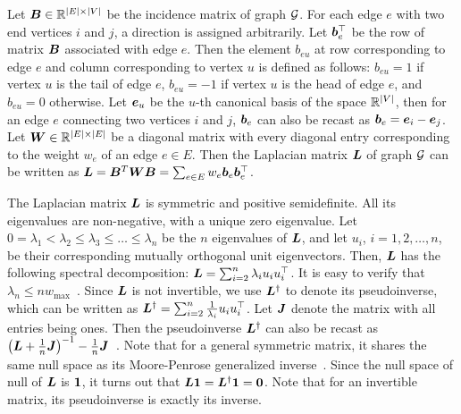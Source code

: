 \documentclass[10pt,twocolumn,twoside]{IEEEtran}
\begin{document}
Let \(\boldsymbol{B} \in \mathbb{R}^{|E| \times \left|V \right|}\) be the incidence matrix of graph \(\mathcal{G}\). For each edge \(e\) with two end vertices \(i\) and \(j\), a direction is assigned arbitrarily. Let \(\boldsymbol{b}_e^\top\) be the row of matrix \(\boldsymbol{B}\) associated with edge \(e\). Then the element \(b_{eu}\) at row corresponding to edge \(e\) and column corresponding to vertex \(u\) is defined as follows: \(b_{eu} = 1\) if vertex \(u\) is the tail of edge \(e\), \(b_{eu}=-1\) if vertex \(u\) is the head of  edge \(e\), and \(b_{eu}=0\) otherwise. Let \(\boldsymbol{e}_u\) be the \(u\)-th canonical basis of the space \(\mathbb{R}^{\left|V \right|}\), then for an edge \(e\) connecting two vertices \(i\) and \(j\), \(\boldsymbol{b}_e\) can also be recast as \(\boldsymbol{b}_e=\boldsymbol{e}_{i}-\boldsymbol{e}_{j}\).  Let  \(\boldsymbol{W} \in \mathbb{R}^{|E| \times |E|}\) be a diagonal matrix with every diagonal entry corresponding to the weight  \(w_e\) of an edge  $e\in E$. Then the Laplacian matrix \(\boldsymbol{L}\) of graph \(\mathcal{G}\) can be written as \(\boldsymbol{L}=\boldsymbol{B}^T\boldsymbol{W}\boldsymbol{B}=\sum_{e\in E}w_e\boldsymbol{b}_e\boldsymbol{b}_e^{\top}\).

The Laplacian matrix \(\boldsymbol{L}\) is symmetric and positive semidefinite. All  its eigenvalues  are non-negative, with a unique zero eigenvalue. Let \(0=\lambda_1< \lambda_2 \leq \lambda_3\leq \dots\leq \lambda_{n}\) be the \(n\) eigenvalues of  \(\boldsymbol{L}\), and let \(u_i\), \( i={1,2,\dots,n}\), be their corresponding mutually orthogonal  unit eigenvectors. Then, \(\boldsymbol{L}\) has the following spectral decomposition:  \(\boldsymbol{L}=\sum_{i=2}^{n}\lambda_i u_iu_i^\top\).  It is easy to verify that \( \lambda_{n}\leq n w_{\max}\)~\cite{LiSc18}.
Since \(\boldsymbol{L}\) is not invertible, we use \(\boldsymbol{L}^{\dagger}\) to denote its pseudoinverse, which can be written as \(\boldsymbol{L}^{\dagger}=\sum_{i=2}^{n}\frac{1}{\lambda_i}u_iu_i^{\top}\). Let \(\boldsymbol{J}\) denote the matrix with all entries being ones. Then the pseudoinverse \(\boldsymbol{L}^{\dagger}\) can also be recast as \(\left( \boldsymbol{L} +\frac{1}{n}\boldsymbol{J} \right)^{-1} - \frac{1}{n}\boldsymbol{J}\)~\cite{GhBoSa08}. Note that for a general symmetric matrix, it shares the same null space as its Moore-Penrose generalized inverse~\cite{BeGrTh74}.
Since the  null space of  null of \({\boldsymbol{L}}\) is \( \boldsymbol{1}\),  it turns out that \({\boldsymbol{L}} \boldsymbol{1} ={\boldsymbol{L}}^{\dagger} \boldsymbol{1} =\mathbf{0}\). Note that for an invertible matrix, its pseudoinverse is exactly its inverse.

\end{document}
